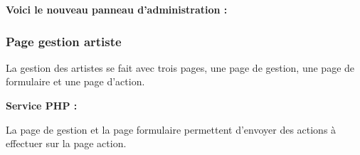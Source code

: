             
            \begin{paragraphe}
                \textbf{Voici le nouveau panneau d'administration :}
            \end{paragraphe}
            
            
    \clearpage

		\subsubsection{Page gestion artiste}
        
            \begin{paragraphe}
                La gestion des artistes se fait avec trois pages, une page de gestion, une page de formulaire et une page d'action.
            \end{paragraphe}

			\begin{paragraphe}
				\textbf{Service PHP :}
			\end{paragraphe}

			\begin{paragraphe}
                La page de gestion et la page formulaire permettent d'envoyer des actions à effectuer sur la page action.
			\end{paragraphe}

